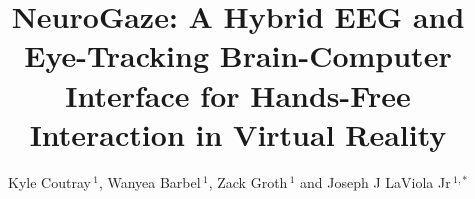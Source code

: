 \documentclass[utf8]{FrontiersinHarvard} %
\def\firstAuthorLast{Coutray {et~al.}} %
\def\Authors{Kyle Coutray\,$^{1}$, Wanyea Barbel\,$^{1}$, Zack Groth\,$^{1}$ and Joseph J LaViola Jr\,$^{1,*}$}
\begin{document}
\onecolumn
{}

\title[Running Title]{NeuroGaze: A Hybrid EEG and Eye-Tracking Brain-Computer Interface for Hands-Free Interaction in Virtual Reality}

\author[\firstAuthorLast ]{\Authors} %
\address{} %
\correspondance{} %

\extraAuth{}%


\maketitle
\end{document}
